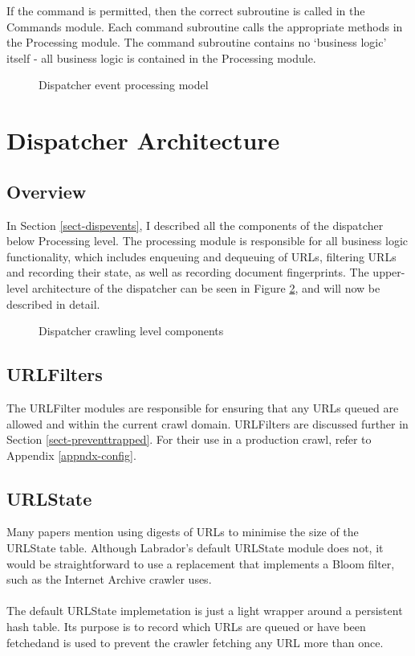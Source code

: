 If the command is permitted, then the correct subroutine is called in the Commands module. Each command subroutine calls the appropriate methods in the Processing module. The command subroutine contains no `business logic' itself - all business logic is contained in the Processing module.

\begin{figure}[h]
  \centerline{
  }
  \caption{Dispatcher event processing model}
  \label{fig-disp_events}
\end{figure}

\section{Dispatcher Architecture}
\subsection{Overview}
In Section \ref{sect-dispevents}, I described all the components of the dispatcher below Processing level. The processing module is responsible for all business logic functionality, which includes enqueuing and dequeuing of URLs, filtering URLs and recording their state, as well as recording document fingerprints. The upper-level architecture of the dispatcher can be seen in Figure \ref{fig-disp_layers2}, and will now be described in detail.


\begin{figure}[h]
  \centerline{
  }
  \caption{Dispatcher crawling level components}
  \label{fig-disp_layers2}
\end{figure}

\subsection{URLFilters}
The URLFilter modules are responsible for ensuring that any URLs queued are allowed and within the current crawl domain. URLFilters are discussed further in Section \ref{sect-preventtrapped}. For their use in a production crawl, refer to Appendix \ref{appndx-config}.
\subsection{URLState}
Many papers\cite{ref1,ref2} mention using digests of URLs to minimise the size of the URLState table. Although Labrador's default URLState module does not, it would be straightforward to use a replacement that implements a Bloom filter, such as the Internet Archive crawler uses\cite{ref16}.\\
\ \\
The default URLState implemetation is just a light wrapper around a persistent hash table. Its purpose is to record which URLs are queued or have been fetchedand is used to prevent the crawler fetching any URL more than once.
